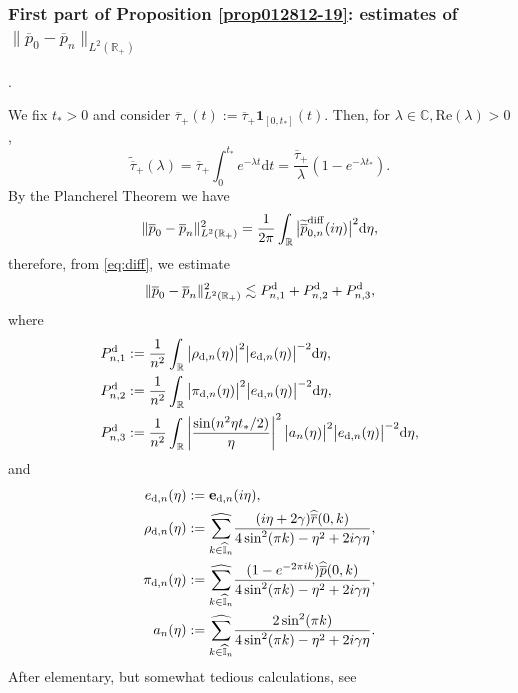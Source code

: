 \documentclass[EJP]{ejpecp} %
\newcommand\R{{\mathbb R}}
\newcommand\T{{\mathbb I}}
\newcommand \ga{\gamma}
\newcommand \la{\lambda}
\newcommand{\dd  }{\mathrm{d}}
\renewcommand{\hat}{\widehat}
\renewcommand{\tilde}{\widetilde}
\renewcommand{\bar}{\overline}
\numberwithin{equation}{section}
\begin{document}
\subsubsection{First part of Proposition \ref{prop012812-19}: estimates of $\|\bar p_0-\bar p_n\|_{L^2(\R_+)}$}.  



We fix $t_*>0$ and consider 
$\bar\tau_+(t):=\bar\tau_+ \mathbf 1_{[0,t_*]}(t)$. Then, for $\lambda \in \mathbb{C}, \mathrm{Re}(\lambda)>0$,
$$
\tilde{\bar
    \tau}_+(\la) =\bar\tau_+\int_0^{t_*}e^{-\la t}\dd
  t=\frac{\bar\tau_+}{\la}\left(1-e^{-\la t_*}\right).
$$
By the Plancherel Theorem we have
\begin{equation}
\label{plancherel1}
\|\bar p_0-\bar p_n\|_{L^2(\R_+)}^2=\frac{1}{2\pi}\int_{\R}\big|\tilde{\bar
  p}_{0,n}^{\rm diff}(i\eta)\big|^2\dd\eta,
\end{equation}
therefore, from \eqref{eq:diff}, we estimate
\begin{equation}
\label{012712-19}
\|\bar p_0-\bar
  p_n\|_{L^2(\R_+)}^2\lesssim P^{\rm d}_{n,1}+P^{\rm d}_{n,2}+P^{\rm d}_{n,3},
\end{equation}
where
\begin{align}
&P^{\rm d}_{n,1}:=\frac{1}{n^2}\int_{\R}\big|\rho_{{\rm d},n}(\eta) \big|^2
 \big|e_{{\rm d},n}(\eta)\big|^{-2}\dd\eta,
\label{022712-19a}\\
&P^{\rm d}_{n,2}:=\frac{1}{n^2}\int_{\R}\big|\pi_{{\rm d},n}(\eta) \big|^2
 \big|e_{{\rm d},n} (\eta)\big|^{-2}\dd\eta,
\label{022712-19b}\\
&P^{\rm d}_{n,3}:=\frac{1}{n^2}\int_{\R}\left|\frac{\sin(n^2\eta
  t_*/2)}{\eta}\right|^2\big|a_{n}(\eta) \big|^2
 \big|e_{{\rm d},n}(\eta)\big|^{-2}\dd\eta,
\label{022712-19c}
\end{align}
and 
\begin{align}
e_{{\rm d},n}(\eta)&:=\mathbf{e}_{{\rm d},n}(i\eta), \label{e-d}\\
 \rho_{{\rm d},n}(\eta)&:=\underset{{k\in \widehat{\T}_n}}{{\hat\sum}}\frac{(i\eta+2\ga)\widehat{\bar
    r}(0,k)}{4\sin^2(\pi  k)-\eta^2+2i\ga \eta},\label{pi-d}\\
 \pi_{{\rm d},n}(\eta)&:=\underset{{k\in \widehat{\T}_n}}{{\hat\sum}}\frac{(1-e^{-2\pi
    i k})\widehat{\bar p}(0,k)}{4\sin^2(\pi  k)-\eta^2+2i\ga \eta},
\label{rho-d}\\
a_{n}(\eta)&:=\underset{{k\in \widehat{\T}_n}}{{\hat\sum}}\frac{2\sin^2(\pi
  k)}{4\sin^2(\pi  k)-\eta^2+2i\ga \eta } .
\label{a-n}
\end{align}
After elementary, but somewhat tedious calculations, see
\end{document}
